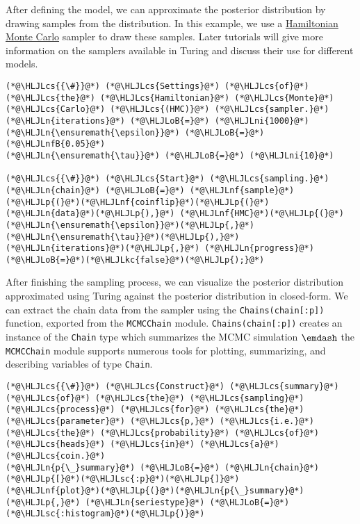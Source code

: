\documentclass[12pt,a4paper]{article}
\newcommand{\HLJLkc}[1]{\textcolor[RGB]{59,151,46}{\textit{#1}}}
\newcommand{\HLJLn}[1]{#1}
\newcommand{\HLJLnf}[1]{\textcolor[RGB]{66,102,213}{#1}}
\newcommand{\HLJLsc}[1]{\textcolor[RGB]{201,61,57}{#1}}
\newcommand{\HLJLnfB}[1]{\textcolor[RGB]{59,151,46}{#1}}
\newcommand{\HLJLni}[1]{\textcolor[RGB]{59,151,46}{#1}}
\newcommand{\HLJLoB}[1]{\textcolor[RGB]{102,102,102}{\textbf{#1}}}
\newcommand{\HLJLp}[1]{#1}
\newcommand{\HLJLcs}[1]{\textcolor[RGB]{153,153,119}{\textit{#1}}}
\begin{document}
After defining the model, we can approximate the posterior distribution by drawing samples from the distribution. In this example, we use a \href{https://en.wikipedia.org/wiki/Hamiltonian_Monte_Carlo}{Hamiltonian Monte Carlo} sampler to draw these samples. Later tutorials will give more information on the samplers available in Turing and discuss their use for different models.


\begin{lstlisting}
(*@\HLJLcs{{\#}}@*) (*@\HLJLcs{Settings}@*) (*@\HLJLcs{of}@*) (*@\HLJLcs{the}@*) (*@\HLJLcs{Hamiltonian}@*) (*@\HLJLcs{Monte}@*) (*@\HLJLcs{Carlo}@*) (*@\HLJLcs{(HMC)}@*) (*@\HLJLcs{sampler.}@*)
(*@\HLJLn{iterations}@*) (*@\HLJLoB{=}@*) (*@\HLJLni{1000}@*)
(*@\HLJLn{\ensuremath{\epsilon}}@*) (*@\HLJLoB{=}@*) (*@\HLJLnfB{0.05}@*)
(*@\HLJLn{\ensuremath{\tau}}@*) (*@\HLJLoB{=}@*) (*@\HLJLni{10}@*)

(*@\HLJLcs{{\#}}@*) (*@\HLJLcs{Start}@*) (*@\HLJLcs{sampling.}@*)
(*@\HLJLn{chain}@*) (*@\HLJLoB{=}@*) (*@\HLJLnf{sample}@*)(*@\HLJLp{(}@*)(*@\HLJLnf{coinflip}@*)(*@\HLJLp{(}@*)(*@\HLJLn{data}@*)(*@\HLJLp{),}@*) (*@\HLJLnf{HMC}@*)(*@\HLJLp{(}@*)(*@\HLJLn{\ensuremath{\epsilon}}@*)(*@\HLJLp{,}@*) (*@\HLJLn{\ensuremath{\tau}}@*)(*@\HLJLp{),}@*) (*@\HLJLn{iterations}@*)(*@\HLJLp{,}@*) (*@\HLJLn{progress}@*)(*@\HLJLoB{=}@*)(*@\HLJLkc{false}@*)(*@\HLJLp{);}@*)
\end{lstlisting}


After finishing the sampling process, we can visualize the posterior distribution approximated using Turing against the posterior distribution in closed-form. We can extract the chain data from the sampler using the \texttt{Chains(chain[:p])} function, exported from the \texttt{MCMCChain} module. \texttt{Chains(chain[:p])} creates an instance of the \texttt{Chain} type which summarizes the MCMC simulation \ensuremath{\emdash} the \texttt{MCMCChain} module supports numerous tools for plotting, summarizing, and describing variables of type \texttt{Chain}.


\begin{lstlisting}
(*@\HLJLcs{{\#}}@*) (*@\HLJLcs{Construct}@*) (*@\HLJLcs{summary}@*) (*@\HLJLcs{of}@*) (*@\HLJLcs{the}@*) (*@\HLJLcs{sampling}@*) (*@\HLJLcs{process}@*) (*@\HLJLcs{for}@*) (*@\HLJLcs{the}@*) (*@\HLJLcs{parameter}@*) (*@\HLJLcs{p,}@*) (*@\HLJLcs{i.e.}@*) (*@\HLJLcs{the}@*) (*@\HLJLcs{probability}@*) (*@\HLJLcs{of}@*) (*@\HLJLcs{heads}@*) (*@\HLJLcs{in}@*) (*@\HLJLcs{a}@*) (*@\HLJLcs{coin.}@*)
(*@\HLJLn{p{\_}summary}@*) (*@\HLJLoB{=}@*) (*@\HLJLn{chain}@*)(*@\HLJLp{[}@*)(*@\HLJLsc{:p}@*)(*@\HLJLp{]}@*)
(*@\HLJLnf{plot}@*)(*@\HLJLp{(}@*)(*@\HLJLn{p{\_}summary}@*)(*@\HLJLp{,}@*) (*@\HLJLn{seriestype}@*) (*@\HLJLoB{=}@*) (*@\HLJLsc{:histogram}@*)(*@\HLJLp{)}@*)
\end{lstlisting}
\end{document}
